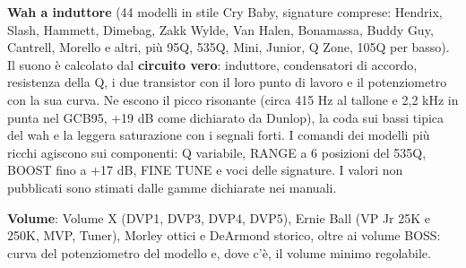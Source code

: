 \documentclass[11pt,a4paper]{article}
\begin{document}
\textbf{Wah a induttore} (44 modelli in stile Cry Baby, signature comprese: Hendrix, Slash, Hammett,
Dimebag, Zakk Wylde, Van Halen, Bonamassa, Buddy Guy, Cantrell, Morello e altri, più 95Q, 535Q, Mini,
Junior, Q Zone, 105Q per basso). Il suono è calcolato dal \textbf{circuito vero}: induttore, condensatori
di accordo, resistenza della Q, i due transistor con il loro punto di lavoro e il potenziometro con la sua
curva. Ne escono il picco risonante (circa 415 Hz al tallone e 2,2 kHz in punta nel GCB95, +19 dB come
dichiarato da Dunlop), la coda sui bassi tipica del wah e la leggera saturazione con i segnali forti.
I comandi dei modelli più ricchi agiscono sui componenti: Q variabile, RANGE a 6 posizioni del 535Q,
BOOST fino a +17 dB, FINE TUNE e voci delle signature. I valori non pubblicati sono stimati dalle
gamme dichiarate nei manuali.

\textbf{Volume}: Volume X (DVP1, DVP3, DVP4, DVP5), Ernie Ball (VP Jr 25K e 250K, MVP, Tuner),
Morley ottici e DeArmond storico, oltre ai volume BOSS: curva del potenziometro del modello e, dove c'è,
il volume minimo regolabile.
\end{document}
